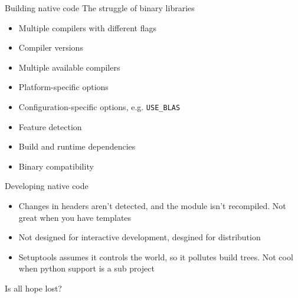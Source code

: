 \documentclass[pdf]{beamer}
\begin{document}
\begin{frame}[fragile]{Building native code}
    The struggle of binary libraries

    \begin{itemize}
        \item Multiple compilers with different flags
        \item Compiler versions
        \item Multiple available compilers
        \item Platform-specific options
        \item Configuration-specific options, e.g. \verb|USE_BLAS|
        \item Feature detection
        \item Build and runtime dependencies
        \item Binary compatibility
    \end{itemize}

\end{frame}

\begin{frame}{Developing native code}
    \begin{itemize}
        \item Changes in headers aren't detected, and the module isn't
              recompiled. Not great when you have templates
        \item Not designed for interactive development, desgined for
              distribution
        \item Setuptools assumes it controls the world, so it pollutes build
              trees. Not cool when python support is a sub project
    \end{itemize}

\end{frame}

\begin{frame}
    Is all hope lost?

\end{frame}
\end{document}
